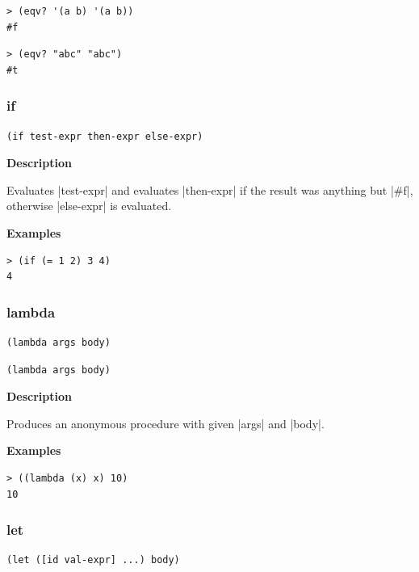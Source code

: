 \documentclass[a4paper]{article}
\begin{document}
\begin{lstlisting}
> (eqv? '(a b) '(a b))
#f
\end{lstlisting}

\begin{lstlisting}
> (eqv? "abc" "abc")
#t
\end{lstlisting}

\subsubsection{if}

\begin{lstlisting}[frame=none]
(if test-expr then-expr else-expr)
\end{lstlisting}

\textbf{Description}

Evaluates |test-expr| and evaluates |then-expr| if the result was anything but |#f|, otherwise |else-expr| is evaluated.

\textbf{Examples}

\begin{lstlisting}
> (if (= 1 2) 3 4)
4
\end{lstlisting}

\subsubsection{lambda}

\begin{lstlisting}[frame=none,language=SchemeBasic,belowskip=0pt]
(lambda args body)
\end{lstlisting}
\begin{lstlisting}[frame=none,aboveskip=0pt]
(lambda args body)
\end{lstlisting}

\textbf{Description}

Produces an anonymous procedure with given |args| and |body|.

\textbf{Examples}

\begin{lstlisting}
> ((lambda (x) x) 10)
10
\end{lstlisting}

\subsubsection{let}

\begin{lstlisting}[frame=none]
(let ([id val-expr] ...) body)
\end{lstlisting}
\end{document}
